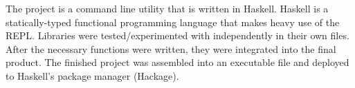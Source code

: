   The project is a command line utility that is written in Haskell. Haskell is a statically-typed functional programming language that makes heavy use of the REPL. Libraries were tested/experimented with independently in their own files. After the necessary functions were written, they were integrated into the final product. The finished project was assembled into an executable file and deployed to Haskell's package manager (Hackage). 